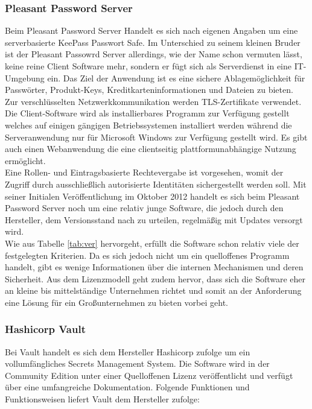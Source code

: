 \documentclass[
book,
a4paper,   
titlepage,  
halfparskip,
12pt        
]{scrartcl}
\begin{document}
\begin{onehalfspacing}
\subsubsection{Pleasant Password Server}
Beim Pleasant Password Server Handelt es sich nach eigenen Angaben um eine serverbasierte KeePass Passwort Safe. Im Unterschied zu seinem kleinen Bruder ist der Pleasant Passowrd Server allerdings, wie der Name schon vermuten lässt, keine reine Client Software mehr, sondern er fügt sich als Serverdienst in eine \ac{IT}-Umgebung ein. Das Ziel der Anwendung ist es eine sichere Ablagemöglichkeit für Passwörter, Produkt-Keys, Kreditkarteninformationen und Dateien zu bieten. Zur verschlüsselten Netzwerkkommunikation werden \ac{TLS}-Zertifikate verwendet. Die Client-Software wird als installierbares Programm zur Verfügung gestellt welches auf einigen gängigen Betriebssystemen installiert werden während die Serveranwendung nur für Microsoft Windows zur Verfügung gestellt wird. Es gibt auch einen Webanwendung die eine clientseitig plattformunabhängige Nutzung ermöglicht.\cite{pleasant}\\
Eine Rollen- und Eintragsbasierte Rechtevergabe ist vorgesehen, womit der Zugriff durch ausschließlich autorisierte Identitäten sichergestellt werden soll. Mit seiner Initialen Veröffentlichung im Oktober 2012 handelt es sich beim Pleasant Password Server noch um eine relativ junge Software, die jedoch durch den Hersteller, dem Versionsstand nach zu urteilen, regelmäßig mit Updates versorgt wird.\cite{pleasant}\\
Wie aus Tabelle \vref{tab:ver} hervorgeht, erfüllt die Software schon relativ viele der festgelegten Kriterien. Da es sich jedoch nicht um ein quelloffenes Programm handelt, gibt es wenige Informationen über die internen Mechanismen und deren Sicherheit. Aus dem Lizenzmodell geht zudem hervor, dass sich die Software eher an kleine bis mittelständige Unternehmen richtet und somit an der Anforderung eine Lösung für ein Großunternehmen zu bieten vorbei geht.

\subsubsection{Hashicorp Vault}
\label{subsubsec:vault}
Bei Vault handelt es sich dem Hersteller Hashicorp zufolge um ein vollumfängliches Secrets Management System. Die Software wird in der Community Edition unter einer Quelloffenen Lizenz veröffentlicht und verfügt über eine umfangreiche Dokumentation. Folgende Funktionen und Funktionsweisen liefert Vault dem Hersteller zufolge:


\end{onehalfspacing}
\end{document}
